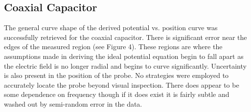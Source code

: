 \documentclass[10pt, twocolumn]{article}
\theoremstyle{definition}
\begin{document}
\subsection{Coaxial Capacitor}
The general curve shape of the derived potential vs. position curve was successfully retrieved for the coaxial capacitor.
There is significant error near the edges of the measured region (see Figure 4).
These regions are where the assumptions made in deriving
the ideal potential equation begin to fall apart as the electric field is no longer radial and begins to curve significantly.
Uncertainty is also present in the position of the probe. No strategies were employed to accurately locate the probe beyond visual inspection.
There does appear to be some dependence on frequency though if it does exist it is fairly subtle and washed out by semi-random error
in the data.
\end{document}
